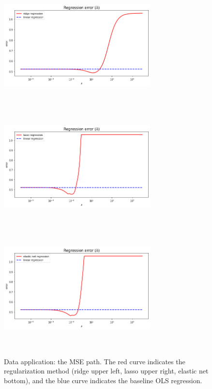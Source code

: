 \begin{figure}[H]
\centering
\includegraphics[width=8cm,height=6.5cm, left]{material/Img/data_ridge_vs_lambda.png}
\includegraphics[width=8cm,height=6.5cm, right]{material/Img/data_lasso_vs_lambda.png}\\
\centering
\includegraphics[width=8cm,height=6.5cm, center]{material/Img/data_elnet_vs_lambda.png}\\
\caption[Data application: the MSE path]{Data application: the MSE path. The red curve indicates the regularization method (ridge upper left, lasso upper right, elastic net bottom), and the blue curve indicates the baseline OLS regression.}
 \label{fig:data_mse_path}
\end{figure}

